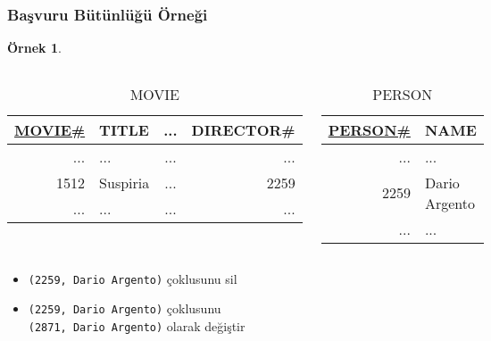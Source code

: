 \documentclass[dvipsnames]{beamer}
\theoremstyle{definition}
\theoremstyle{example}
\newtheorem{ornek}[theorem]{Örnek}
\theoremstyle{plain}
\begin{document}
\begin{frame}
  \frametitle{Başvuru Bütünlüğü Örneği}

  \begin{ornek}
    \begin{columns}
      \begin{tiny}
      \begin{table}
        \caption{MOVIE}
        \begin{tabular}{|r|l|c|r|}\hline
\underline{MOVIE\#} & TITLE & ... & DIRECTOR\#\\[2pt]\hline\hline
             ... & ...      & ... &        ...\\\hline
            1512 & Suspiria & ... &       2259\\\hline
             ... & ...      & ... &        ...\\\hline
        \end{tabular}
      \end{table}
      \end{tiny}

      \begin{tiny}
      \begin{table}
        \caption{PERSON}
        \begin{tabular}{|r|l|}\hline
\underline{PERSON\#} & NAME\\[2pt]\hline\hline
        ... & ...          \\\hline
       2259 & Dario Argento\\\hline
        ... & ...          \\\hline
        \end{tabular}
      \end{table}
      \end{tiny}
    \end{columns}

    \pause
    \begin{itemize}
      \item \texttt{(2259, Dario Argento)} çoklusunu sil
      \item \texttt{(2259, Dario Argento)} çoklusunu\\
        \texttt{(2871, Dario Argento)} olarak değiştir
    \end{itemize}
  \end{ornek}
\end{frame}
\end{document}
